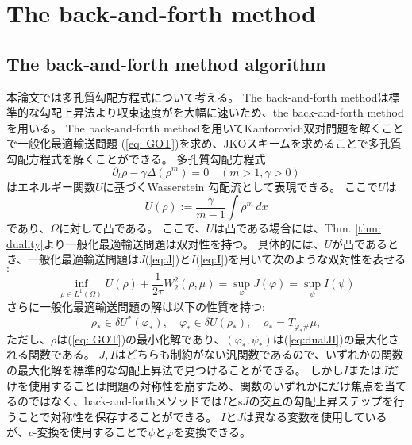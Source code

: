 \chapter{The back-and-forth method} 
\label{ch:The back-and-forth method}
\section{The back-and-forth method algorithm}
\label{sect:The back-and-forth method algorithm}
本論文では多孔質勾配方程式について考える。
The back-and-forth methodは標準的な勾配上昇法より収束速度がを大幅に速いため、the back-and-forth methodを用いる。
The back-and-forth methodを用いてKantorovich双対問題を解くことで一般化最適輸送問題
(\ref{eq: GOT})を求め、JKOスキームを求めることで多孔質勾配方程式を解くことができる。
多孔質勾配方程式
\[
    \partial_t \rho - \gamma\Delta(\rho^m) = 0  \quad(m > 1, \gamma > 0)
\]
はエネルギー関数$U$に基づくWasserstein 勾配流として表現できる。
ここで$U$は
\[
    U(\rho) := \frac{\gamma}{{m-1}} \int \rho^m \, dx
\]
であり、$\Omega$に対して凸である。
ここで、$U$は凸である場合には、Thm. \ref{thm: duality}より一般化最適輸送問題は双対性を持つ。
具体的には、$U$が凸であるとき、一般化最適輸送問題は$J$(\ref{eq:J})と$I$(\ref{eq:I})を用いて次のような双対性を表せる$:$
$$
    \inf_{\rho \in L^1(\Omega)} U(\rho) + \frac{1}{2 \tau} W^2_2(\rho, \mu) = \sup_\varphi J(\varphi) = \sup_\psi I (\psi)
$$
さらに一般化最適輸送問題の解は以下の性質を持つ$:$
\begin{equation}
    \label{eq:dualJI}
    \rho_* \in \delta U^*(\varphi_*), \quad \varphi_* \in \delta U(\rho_*), \quad \rho_* = T_{\varphi_* \#} \mu,
\end{equation}
ただし、$\rho$は(\ref{eq: GOT})の最小化解であり、$(\varphi_*, \psi_*)$は(\ref{eq:dualJI})の最大化される関数である。
$J, I$はどちらも制約がない汎関数であるので、いずれかの関数の最大化解を標準的な勾配上昇法で見つけることができる。
しかし$I$または$J$だけを使用することは問題の対称性を崩すため、関数のいずれかにだけ焦点を当てるのではなく、back-and-forthメソッドでは$I$とs$J$の交互の勾配上昇ステップを行うことで対称性を保存することができる。
$I$と$J$は異なる変数を使用しているが、$c$-変換を使用することで$\psi$と$\varphi$を変換できる。


